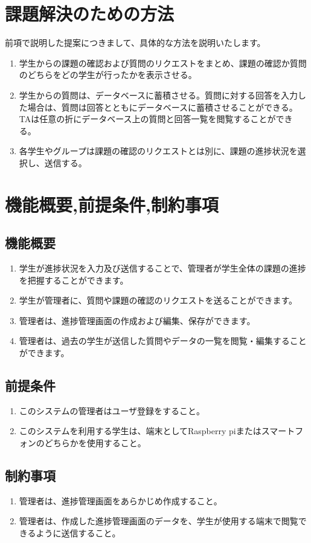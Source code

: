 \documentclass[a4j,titlepage]{ujarticle}
\begin{document}
\section{課題解決のための方法}
前項で説明した提案につきまして、具体的な方法を説明いたします。
\begin{enumerate}[(1)]
\item 学生からの課題の確認および質問のリクエストをまとめ、課題の確認か質問のどちらをどの学生が行ったかを表示させる。
\item 学生からの質問は、データベースに蓄積させる。質問に対する回答を入力した場合は、質問は回答とともにデータベースに蓄積させることができる。TAは任意の折にデータベース上の質問と回答一覧を閲覧することができる。
\item 各学生やグループは課題の確認のリクエストとは別に、課題の進捗状況を選択し、送信する。
\end{enumerate}

\section{機能概要,前提条件,制約事項}

\subsection{機能概要}
\begin{enumerate}[(1)]
\item 学生が進捗状況を入力及び送信することで、管理者が学生全体の課題の進捗を把握することができます。
\item 学生が管理者に、質問や課題の確認のリクエストを送ることができます。
\item 管理者は、進捗管理画面の作成および編集、保存ができます。
\item 管理者は、過去の学生が送信した質問やデータの一覧を閲覧・編集することができます。　
\end{enumerate}

\subsection{前提条件}
\begin{enumerate}[(1)]
\item このシステムの管理者はユーザ登録をすること。
\item このシステムを利用する学生は、端末としてRaspberry piまたはスマートフォンのどちらかを使用すること。
\end{enumerate}

\subsection{制約事項}
\begin{enumerate}[(1)]
\item 管理者は、進捗管理画面をあらかじめ作成すること。
\item 管理者は、作成した進捗管理画面のデータを、学生が使用する端末で閲覧できるように送信すること。
\end{enumerate}
\end{document}
